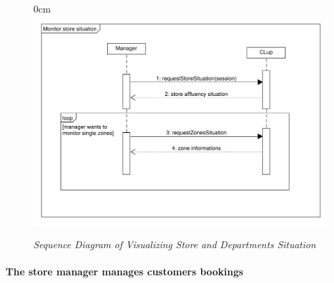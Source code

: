 \documentclass{article}
\begin{document}
\begin{center}
\begin{itemize}
				\end{itemize}
			
					\begin{figure}[!h]
						\begin{adjustwidth} {0cm}{}
							\centering
							\includegraphics[scale=0.25]{SD/8_monitorStoreSituation.pdf}\\
							\caption{\emph{Sequence Diagram of Visualizing Store and Departments Situation}}
						\end{adjustwidth}
					\end{figure}
					
				\end{center}
			
			\newpage
			\paragraph{The store manager manages customers bookings}
			
\end{document}
